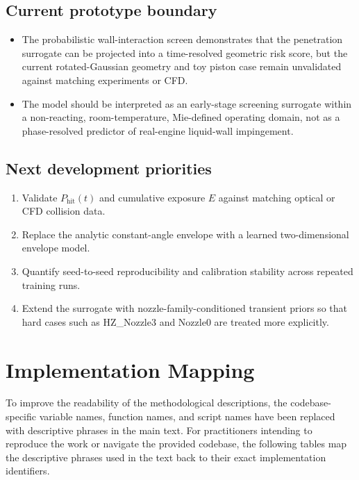 \documentclass[english, 12pt, a4paper, elec, utf8, a-2b, online]{aaltothesis}
\begin{document}
\subsection{Current prototype boundary}

\begin{itemize}
  \item The probabilistic wall-interaction screen demonstrates that the penetration surrogate can be projected into a time-resolved geometric risk score, but the current rotated-Gaussian geometry and toy piston case remain unvalidated against matching experiments or CFD.
  \item The model should be interpreted as an early-stage screening surrogate within a non-reacting, room-temperature, Mie-defined operating domain, not as a phase-resolved predictor of real-engine liquid-wall impingement.
\end{itemize}

\subsection{Next development priorities}

\begin{enumerate}
  \item Validate $P_{\mathrm{hit}}(t)$ and cumulative exposure $E$ against matching optical or CFD collision data.
  \item Replace the analytic constant-angle envelope with a learned two-dimensional envelope model.
  \item Quantify seed-to-seed reproducibility and calibration stability across repeated training runs.
  \item Extend the surrogate with nozzle-family-conditioned transient priors so that hard cases such as HZ\_Nozzle3 and Nozzle0 are treated more explicitly.
\end{enumerate}

\clearpage
\appendix
\section{Implementation Mapping}
\label{app:implementation_mapping}

To improve the readability of the methodological descriptions, the codebase-specific variable names, function names, and script names have been replaced with descriptive phrases in the main text. For practitioners intending to reproduce the work or navigate the provided codebase, the following tables map the descriptive phrases used in the text back to their exact implementation identifiers.
\end{document}
